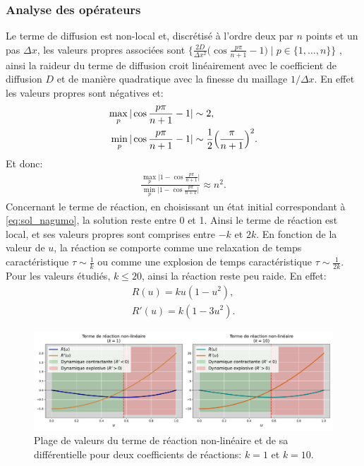 \subsubsection{Analyse des opérateurs}\label{par:analyser_operateurs_nagumo}
Le terme de diffusion est non-local et, discrétisé à l'ordre deux par $n$ points et un pas $\Delta x$, les valeurs propres associées sont 
$\{ \frac{2D}{\Delta x^2} \bigl(\cos \frac{p\pi}{n+1} - 1\bigr) \mid p \in \{1,\dots,n\}\}$ \cite{bouchet2020laplacien}, 
ainsi la raideur du terme de diffusion croit linéairement avec le coefficient de diffusion $D$ et de manière quadratique avec la finesse du maillage $1/\Delta x$.
En effet les valeurs propres sont négatives et:
\begin{align}
    \max_p \vert\cos \frac{p\pi}{n+1} - 1 \vert &\sim 2,\\
    \min_p \vert \cos \frac{p\pi}{n+1} - 1 \vert &\sim \frac{1}{2}\Bigl( \frac{\pi}{n+1} \Bigr)^2.
\end{align}
Et donc:
\begin{align}
    \frac{\max_p \vert 1 - \cos \frac{p\pi}{n+1} \vert}{\min_p \vert 1 - \cos \frac{p\pi}{n+1} \vert} \approx n^2.
\end{align}
Concernant le terme de réaction, en choisissant un état initial correspondant à \ref{eq:sol_nagumo},
la solution reste entre 0 et 1. Ainsi le terme de réaction est local, et ses valeurs propres sont comprises entre $-k$ et $2k$.
En fonction de la valeur de $u$, la réaction se comporte comme une relaxation de temps caractéristique $\tau \sim \frac{1}{k}$ ou comme une explosion de temps 
caractéristique $\tau \sim \frac{1}{2k}$. Pour les valeurs étudiés, $k \leq 20$, ainsi la réaction reste peu raide.
En effet: 
\begin{align}
    R(u) = ku(1-u^2),\\
    R'(u) = k (1 - 3u^2).
\end{align}

\begin{figure}[htbp]
    \centering
    \includegraphics[width=\textwidth]{media/4_travail/2_nagumo/raideur_reaction_nagumo.pdf}
    \caption{Plage de valeurs du terme de réaction non-linéaire et de sa différentielle pour deux coefficients de réactions: $k=1$ et $k=10$.}
    \label{fig:raideur_reaction_nagumo}
\end{figure}

